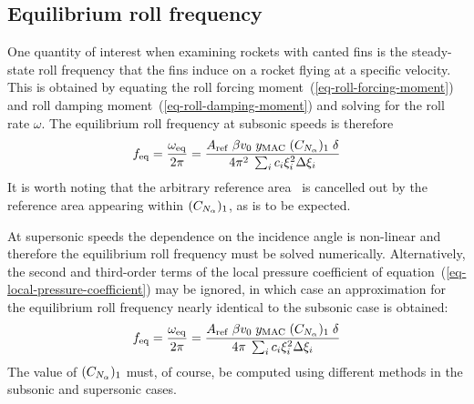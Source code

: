 \subsection{Equilibrium roll frequency}

One quantity of interest when examining rockets with canted fins
is the steady-state roll frequency that the fins induce on a rocket
flying at a specific velocity.  This is obtained by equating the roll
forcing moment~(\ref{eq-roll-forcing-moment}) and roll damping
moment~(\ref{eq-roll-damping-moment}) and solving for the roll rate
$\omega$.  The equilibrium roll frequency at subsonic speeds is
therefore
%
\begin{equation}
f_{\rm eq} = \frac{\omega_{\rm eq}}{2\pi} =
\frac{A_{\rm ref}\; \beta v_0 \; y_{\rm MAC} \; ({C_{N_\alpha}})_1 \; \delta}
{4\pi^2\; \sum_i c_i\xi_i^2\Delta\xi_i}
\label{eq-subsonic-roll-rate}
\end{equation}
%
It is worth noting that the arbitrary reference area \Aref\ is
cancelled out by the reference area appearing within $({C_{N_\alpha}})_1$,
as is to be expected.

At supersonic speeds the dependence on the incidence angle is
non-linear and therefore the equilibrium roll frequency must be solved
numerically.  Alternatively, the second and third-order terms of the
local pressure coefficient of
equation~(\ref{eq-local-pressure-coefficient}) may be ignored, in
which case an approximation for the equilibrium roll frequency nearly
identical to the subsonic case is obtained:
%
\begin{equation}
f_{\rm eq} = \frac{\omega_{\rm eq}}{2\pi} =
\frac{A_{\rm ref}\; \beta v_0 \; y_{\rm MAC} \; ({C_{N_\alpha}})_1 \; \delta}
{4\pi\; \sum_i c_i\xi_i^2\Delta\xi_i}
\label{eq-supersonic-roll-rate}
\end{equation}
%
The value of $({C_{N_\alpha}})_1$ must, of course, be computed using different
methods in the subsonic and supersonic cases.




